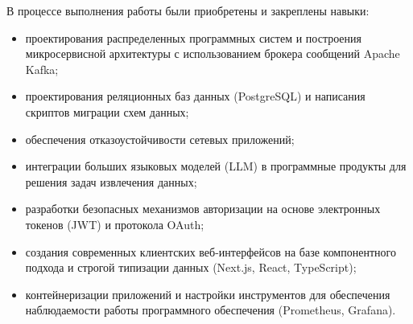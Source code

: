 В процессе выполнения работы были приобретены и закреплены навыки:
\begin{itemize}

    \item проектирования распределенных программных систем и построения микросервисной архитектуры с использованием брокера сообщений Apache Kafka;

    \item проектирования реляционных баз данных (PostgreSQL) и написания скриптов миграции схем данных;

    \item обеспечения отказоустойчивости сетевых приложений;

    \item интеграции больших языковых моделей (LLM) в программные продукты для решения задач извлечения данных;

    \item разработки безопасных механизмов авторизации на основе электронных токенов (JWT) и протокола OAuth;

    \item создания современных клиентских веб-интерфейсов на базе компонентного подхода и строгой типизации данных (Next.js, React, TypeScript);

    \item контейнеризации приложений и настройки инструментов для обеспечения наблюдаемости работы программного обеспечения (Prometheus, Grafana).

\end{itemize}